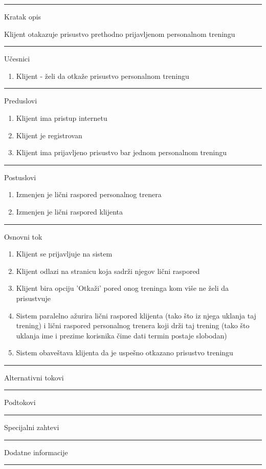 \begin{center}
\vspace{0.2cm}
\hrule
\vspace{0.2cm}
    \begin{center}
    Kratak opis  
    \end{center}
    Klijent otakazuje prisustvo prethodno prijavljenom personalnom treningu
\vspace{0.2cm}
\hrule
\vspace{0.2cm}    
    Učesnici 
    \begin{enumerate}
    \item Klijent - želi da otkaže prisustvo personalnom treningu
    \end{enumerate}
\hrule
\vspace{0.2cm}
   Preduslovi 
   \begin{enumerate}
    \item Klijent ima pristup internetu
    \item Klijent je registrovan
    \item Klijent ima prijavljeno prisustvo bar jednom personalnom treningu
   \end{enumerate}
\hrule
\vspace{0.2cm}
    Postuslovi  
    \begin{enumerate}
    \item Izmenjen je lični raspored personalnog trenera
    \item Izmenjen je lični raspored klijenta
   \end{enumerate} 
\hrule
\vspace{0.2cm}
    Osnovni tok 
    \begin{enumerate}
    \item Klijent se prijavljuje na sistem
    \item Klijent odlazi na stranicu koja sadrži njegov lični raspored
    \item Klijent bira opciju 'Otkaži' pored onog treninga kom više ne želi da prisustvuje
    \item Sistem paralelno ažurira lični raspored klijenta (tako što iz njega uklanja taj trening) i lični raspored personalnog trenera koji drži taj trening (tako što uklanja ime i prezime korisnika čime dati termin postaje slobodan)
    \item Sistem obaveštava klijenta da je uspešno otkazano prisustvo treningu
   \end{enumerate}
\hrule
\vspace{0.2cm}
    Alternativni tokovi  \\
\hrule
\vspace{0.2cm}
    Podtokovi  \\
\hrule
\vspace{0.2cm}
    Specijalni zahtevi  \\
\hrule
\vspace{0.2cm}
    Dodatne informacije  \\
\hrule
\vspace{0.5cm}
\end{center}


